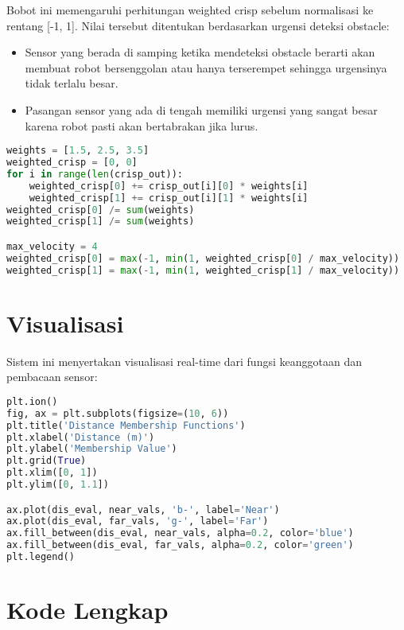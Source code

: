 \documentclass[a4paper,11pt]{article}
\begin{document}
Bobot ini memengaruhi perhitungan weighted crisp sebelum normalisasi ke rentang [-1, 1]. Nilai tersebut ditentukan berdasarkan urgensi deteksi obstacle:
\begin{itemize}
    \item Sensor yang berada di samping ketika mendeteksi obstacle berarti akan membuat robot bersenggolan atau hanya terserempet sehingga urgensinya tidak terlalu besar.
    \item Pasangan sensor yang ada di tengah memiliki urgensi yang sangat besar karena robot pasti akan bertabrakan jika lurus.
\end{itemize}

\begin{lstlisting}[language=Python, caption=Perhitungan Weighted Crisp Output]
weights = [1.5, 2.5, 3.5]
weighted_crisp = [0, 0]
for i in range(len(crisp_out)):
    weighted_crisp[0] += crisp_out[i][0] * weights[i]
    weighted_crisp[1] += crisp_out[i][1] * weights[i]
weighted_crisp[0] /= sum(weights)
weighted_crisp[1] /= sum(weights)

max_velocity = 4
weighted_crisp[0] = max(-1, min(1, weighted_crisp[0] / max_velocity))
weighted_crisp[1] = max(-1, min(1, weighted_crisp[1] / max_velocity))
\end{lstlisting}

\section{Visualisasi}
Sistem ini menyertakan visualisasi real-time dari fungsi keanggotaan dan pembacaan sensor:

\begin{lstlisting}[language=Python, caption=Pengaturan Visualisasi]
plt.ion()
fig, ax = plt.subplots(figsize=(10, 6))
plt.title('Distance Membership Functions')
plt.xlabel('Distance (m)')
plt.ylabel('Membership Value')
plt.grid(True)
plt.xlim([0, 1])
plt.ylim([0, 1.1])

ax.plot(dis_eval, near_vals, 'b-', label='Near')
ax.plot(dis_eval, far_vals, 'g-', label='Far')
ax.fill_between(dis_eval, near_vals, alpha=0.2, color='blue')
ax.fill_between(dis_eval, far_vals, alpha=0.2, color='green')
plt.legend()
\end{lstlisting}

\appendix
\section{Kode Lengkap}

\end{document}
